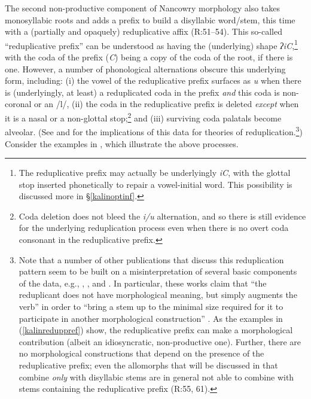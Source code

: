 \documentclass[output=paper]{langscibook}
\begin{document}
The second non-productive component of Nancowry morphology also takes monosyllabic roots and adds a prefix to build a disyllabic word/stem, this time with a (partially and opaquely) reduplicative affix (R:51--54). This so-called ``reduplicative prefix'' can be understood as having the (underlying) shape \textit{ʔiC},\footnote{The reduplicative prefix may actually be underlyingly \textit{iC}, with the glottal stop inserted phonetically to repair a vowel-initial word. This possibility is discussed more in \S\ref{kalinoptinf}.} with the coda of the prefix (\textit{C}) being a copy of the coda of the root, if there is one. However, a number of phonological alternations obscure this underlying form, including: (i)  the vowel of the reduplicative prefix surfaces as \textit{u} when there is (underlyingly, at least) a reduplicated coda in the prefix \textit{and} this coda is non-coronal or an /l/, (ii) the coda in the reduplicative prefix is deleted \textit{except} when it is a nasal or a non-glottal stop;\footnote{Coda deletion does {not} bleed the \textit{i/u} alternation, and so there is still evidence for the underlying reduplication process even when there is no overt coda consonant in the reduplicative prefix.} and (iii) surviving coda palatals become alveolar. (See \citealt[132ff.]{Steriade88} and \citealt[347ff.]{Alderete99} for the implications of this data for theories of reduplication.\footnote{Note that a number of other publications that discuss this reduplication pattern seem to be built on a misinterpretation of several basic components of the data, e.g., \citealt[247ff]{Hendricks99}, \citealt{Meek00}, and \citealt[223--224]{IZ05}. In particular, these works claim that ``the reduplicant does not have morphological meaning, but simply augments the verb'' \citep[58]{Hendricks99} in order to ``bring a stem up to the minimal size required for it to participate in another morphological construction'' \citep[200--201]{IZ05}. As the examples in (\ref{kalinreduppref}) show, the reduplicative prefix can make a morphological contribution (albeit an idiosyncratic, non-productive one). Further, there are no morphological constructions that depend on the presence of the reduplicative prefix; even the allomorphs that will be discussed in  that combine \textit{only} with disyllabic stems are in general not able to combine with stems containing the reduplicative prefix (R:55, 61).}) Consider the examples in \Next, which illustrate the above processes.\largerpage

\ea\label{kalinreduppref} 
\z
\z
\end{document}
